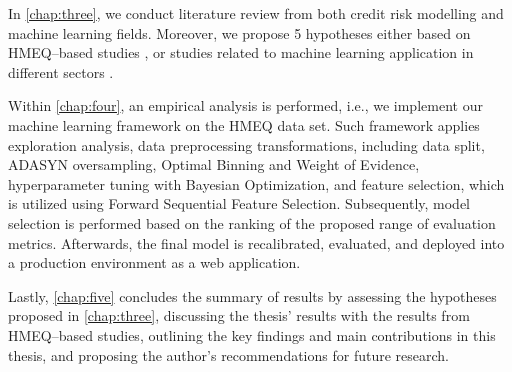 In \autoref{chap:three}, we conduct literature review from both credit risk modelling and machine learning fields. Moreover, we propose 5 hypotheses either based on HMEQ--based studies \citep{serkan2021bagging, zurada2014classification}, or studies related to machine learning application in different sectors \citep{de2023predicting, pintelas2020grey, wu2018accurate}.


Within \autoref{chap:four}, an empirical analysis is performed, i.e., we implement our machine learning framework on the HMEQ data set.
Such framework applies exploration analysis, data preprocessing transformations, including data split, ADASYN oversampling, Optimal Binning and Weight of Evidence, hyperparameter tuning with Bayesian Optimization, and feature selection, which is utilized using Forward Sequential Feature Selection.
Subsequently, model selection is performed based on the ranking of the proposed range of evaluation metrics.
Afterwards, the final model is recalibrated, evaluated, and deployed into a production environment as a web application.


Lastly, \autoref{chap:five} concludes the summary of results by assessing the hypotheses proposed in \autoref{chap:three}, discussing the thesis' results with the results from HMEQ--based studies, outlining the key findings and main contributions in this thesis, and proposing the author's recommendations for future research.

